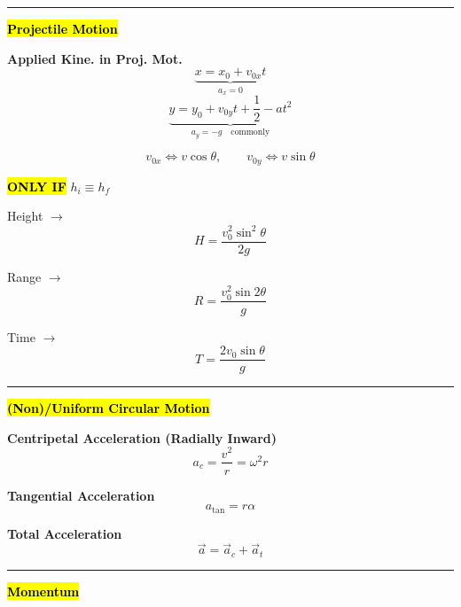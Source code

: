 \documentclass[	DIV=calc,%
							paper=a4,%
							fontsize=11pt,%
							twocolumn]{scrartcl} %
\newcommand{\hformbar}[1]{\vspace{5pt}\hrule\vspace{10pt}} %
\newcommand{\formdesc}[1]{\noindent\textbf{#1}}
\begin{document}
\hformbar{}

\formdesc{\hl{Projectile Motion}}

\textbf{Applied Kine. in Proj. Mot.}
\begin{equation}
    \underbrace{x=x_0+v_{0x}t}_{a_x=0}
\end{equation}
\begin{equation}
    \underbrace{y=y_0+v_{0y}t+\frac{1}{2}-at^2}_{a_y=-g\quad\text{commonly}}
\end{equation}

\begin{equation}
    v_{0x}\iff v\cos\theta,\qquad v_{0y}\iff v\sin\theta
\end{equation}

\textbf{\hl{ONLY IF}} $h_i\equiv h_f$

Height $\rightarrow$\begin{equation}
    H = \frac{v_0^2\sin^2\theta}{2g}
\end{equation}

Range $\rightarrow$\begin{equation}
     R = \frac{v_0^2\sin{2\theta}}{g}
\end{equation}

Time $\rightarrow$\begin{equation}
    T = \frac{2v_0\sin\theta}{g}
\end{equation}
\hformbar{}

\formdesc{\hl{(Non)/Uniform Circular Motion}}

\textbf{Centripetal Acceleration (Radially Inward)}
\begin{equation}
    a_c=\frac{v^2}{r}=\omega^2r
\end{equation}

\textbf{Tangential Acceleration}
\begin{equation}
    a_{\text{tan}}=r\alpha
\end{equation}

\textbf{Total Acceleration}
\begin{equation}
    \vec{a}=\vec a_c+\vec a_t
\end{equation}
\hformbar{}

\formdesc{\hl{Momentum}}
\end{document}

